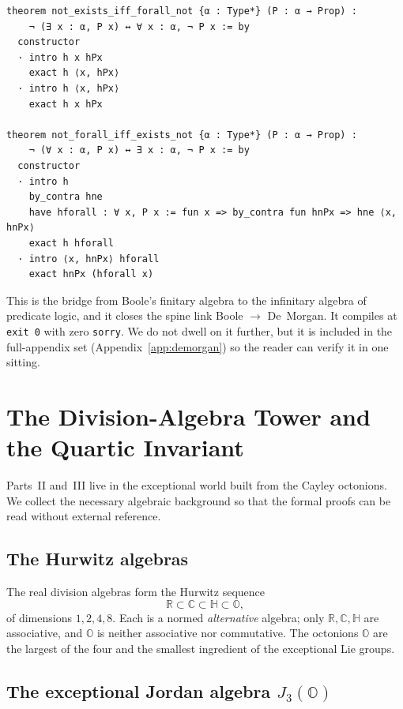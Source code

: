 \documentclass[11pt]{article}
\theoremstyle{definition}
\newcommand{\OO}{\mathbb{O}}
\newcommand{\HH}{\mathbb{H}}
\newcommand{\RR}{\mathbb{R}}
\newcommand{\CC}{\mathbb{C}}
\newcommand{\Jthree}{J_3(\OO)}
\begin{document}
\begin{lstlisting}[language=leanL,caption={De Morgan at the quantifiers
  (DeMorgan\_Quantifiers.lean).}]
theorem not_exists_iff_forall_not {α : Type*} (P : α → Prop) :
    ¬ (∃ x : α, P x) ↔ ∀ x : α, ¬ P x := by
  constructor
  · intro h x hPx
    exact h ⟨x, hPx⟩
  · intro h ⟨x, hPx⟩
    exact h x hPx

theorem not_forall_iff_exists_not {α : Type*} (P : α → Prop) :
    ¬ (∀ x : α, P x) ↔ ∃ x : α, ¬ P x := by
  constructor
  · intro h
    by_contra hne
    have hforall : ∀ x, P x := fun x => by_contra fun hnPx => hne ⟨x, hnPx⟩
    exact h hforall
  · intro ⟨x, hnPx⟩ hforall
    exact hnPx (hforall x)
\end{lstlisting}

This is the bridge from Boole's finitary algebra to the infinitary algebra of
predicate logic, and it closes the spine link Boole $\to$ De~Morgan. It
compiles at \texttt{exit 0} with zero \texttt{sorry}. We do not dwell on it
further, but it is included in the full-appendix set (Appendix~\ref{app:demorgan})
so the reader can verify it in one sitting.

\section{The Division-Algebra Tower and the Quartic Invariant}
\label{sec:tower}

Parts~II and~III live in the exceptional world built from the Cayley
octonions. We collect the necessary algebraic background so that the formal
proofs can be read without external reference.

\subsection{The Hurwitz algebras}
\label{sec:hurwitz}

The real division algebras form the Hurwitz sequence
\[
\RR \subset \CC \subset \HH \subset \OO,
\]
of dimensions $1,2,4,8$. Each is a normed \emph{alternative} algebra; only
$\RR,\CC,\HH$ are associative, and $\OO$ is neither associative nor
commutative. The octonions $\OO$ are the largest of the four and the smallest
ingredient of the exceptional Lie groups.

\subsection{The exceptional Jordan algebra $\Jthree$}
\label{sec:j3o}
\end{document}
